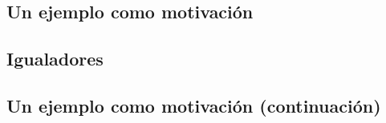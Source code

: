 \subsection{Un ejemplo como motivación}\label{subsection:EjemploMotivacion}
   
\subsection{Igualadores}
   
\subsection{Un ejemplo como motivación (continuación)}
   
